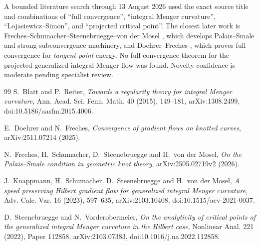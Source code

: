 \documentclass[11pt]{article}
\theoremstyle{remark}
\begin{document}
A bounded literature search through 13 August 2026 used the exact source title
and combinations of ``full convergence'', ``integral Menger curvature'',
``Lojasiewicz--Simon'', and ``projected critical point''.  The closest later
work is Freches--Schumacher--Steenebruegge--von der Mosel
\cite{FSZM}, which develops Palais--Smale and strong-subconvergence machinery,
and Doehrer--Freches \cite{DF}, which proves full convergence for
\emph{tangent-point} energy.  No full-convergence theorem for the projected
generalized-integral-Menger flow was found.  Novelty confidence is moderate
pending specialist review.

\begin{thebibliography}{99}
S.~Blatt and P.~Reiter,
\emph{Towards a regularity theory for integral Menger curvature},
Ann. Acad. Sci. Fenn. Math. 40 (2015), 149--181,
arXiv:1308.2499, doi:10.5186/aasfm.2015.4006.

E.~Doehrer and N.~Freches,
\emph{Convergence of gradient flows on knotted curves},
arXiv:2511.07214 (2025).

N.~Freches, H.~Schumacher, D.~Steenebruegge and H.~von der Mosel,
\emph{On the Palais--Smale condition in geometric knot theory},
arXiv:2505.02719v2 (2026).

J.~Knappmann, H.~Schumacher, D.~Steenebruegge and H.~von der Mosel,
\emph{A speed preserving Hilbert gradient flow for generalized integral
Menger curvature}, Adv. Calc. Var. 16 (2023), 597--635,
arXiv:2103.10408, doi:10.1515/acv-2021-0037.

D.~Steenebruegge and N.~Vorderobermeier,
\emph{On the analyticity of critical points of the generalized integral
Menger curvature in the Hilbert case}, Nonlinear Anal. 221 (2022),
Paper 112858, arXiv:2103.07383, doi:10.1016/j.na.2022.112858.
\end{thebibliography}
\end{document}
